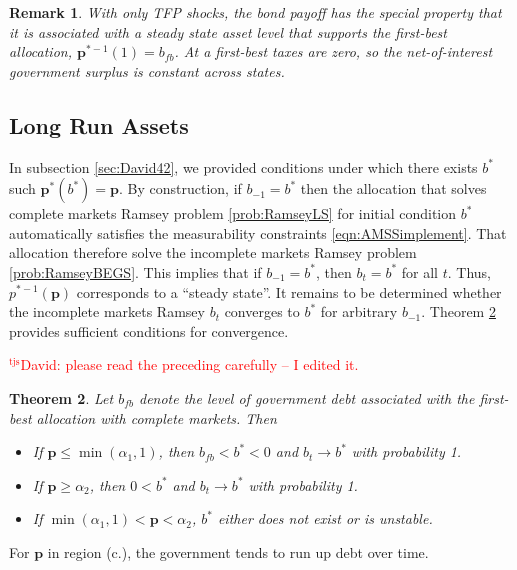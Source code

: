 \documentclass[12pt]{article}
\newcommand{\tjs}[1]{\textcolor{red}{$^{\textrm{tjs}}${#1}}}
\newtheorem{theorem}{Theorem}[section]
\newtheorem{remark}[theorem]{Remark}
\begin{document}
{\begin{remark}
		With only TFP shocks, the bond payoff has the special property that it is associated with a steady state asset level that supports the first-best allocation, $\bm p^{* -1}(1) = b_{fb}$.  At a first-best taxes are zero, so the net-of-interest government surplus is constant across states.
		\end{remark}
\subsection{Long Run Assets} \label{sec:David43}
In subsection \ref{sec:David42},  we provided conditions under which there exists $b^*$ such $\bm p^*(b^*) = \bm p$.  By construction, if $b_{-1} = b^*$ then the allocation that solves complete markets Ramsey problem \ref{prob:RamseyLS} for initial condition $b^*$  automatically satisfies the measurability constraints \eqref{eqn:AMSSimplement}.  That allocation therefore solve the incomplete markets Ramsey problem \ref{prob:RamseyBEGS}.  This implies that if $b_{-1} = b^*$, then $b_t = b^*$ for all $t$.  Thus, $p^{*-1}(\bm p)$ corresponds to a ``steady state''.  It remains to be determined whether  the incomplete markets Ramsey $b_t$  converges to  $b^*$  for arbitrary $b_{-1}$.  Theorem \ref{thm:convergence} provides sufficient conditions for  convergence.} \tjs{David: please read the preceding carefully -- I edited it.}



 	\begin{theorem}\label{thm:convergence}
Let %
$b_{fb}$ denote the level of  government  debt associated with the first-best allocation with complete markets.
Then %
		\begin{itemize}
			\item[a.]  If $\bm{p}\leq\min(\alpha_1,1)$, then  $b_{fb}<b^*<0$ and $b_t\rightarrow b^*$ with probability 1.
			\item[b.] If $\bm{p} \geq \alpha_2$, then   $0<b^*$ and $b_t \rightarrow b^*$ with probability 1.
            \item[c.] If $ \min(\alpha_1,1)<\bm{p}<\alpha_2 $,   $b^*$ either does not exist or is unstable.
									\end{itemize}			\end{theorem}
  For $\bm{p}$ in region (c.),
the government tends to run up debt over time.
\end{document}
